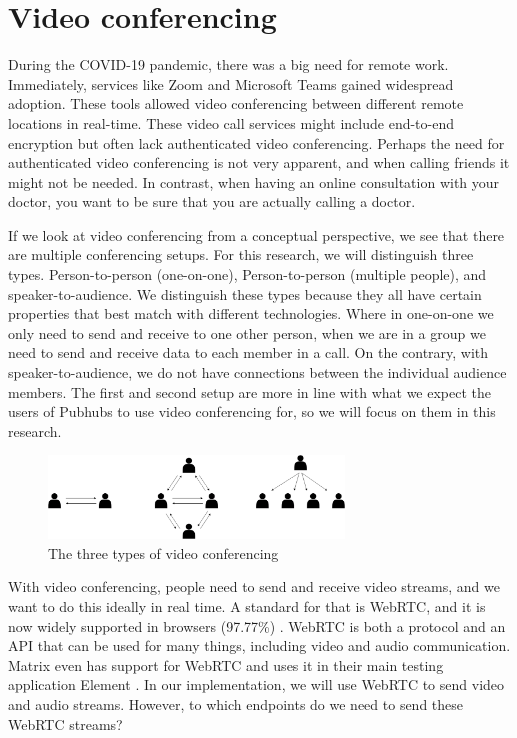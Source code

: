 \documentclass[11pt,a4paper]{article}
\begin{document}
\section{Video conferencing}
During the COVID-19 pandemic, there was a big need for remote work. Immediately, services like Zoom \cite{Zoom}  and Microsoft Teams  \cite{MSTeams} gained widespread adoption. These tools allowed video conferencing between different remote locations in real-time. These video call services might include end-to-end encryption but often lack authenticated video conferencing. Perhaps the need for authenticated video conferencing is not very apparent, and when calling friends it might not be needed. In contrast, when having an online consultation with your doctor, you want to be sure that you are actually calling a doctor.

If we look at video conferencing from a conceptual perspective, we see that there are multiple conferencing setups. For this research, we will distinguish three types. Person-to-person (one-on-one), Person-to-person (multiple people), and speaker-to-audience. We distinguish these types because they all have certain properties that best match with different technologies. Where in one-on-one we only need to send and receive to one other person, when we are in a group we need to send and receive data to each member in a call. On the contrary, with speaker-to-audience, we do not have connections between the individual audience members. The first and second setup are more in line with what we expect the users of Pubhubs to use video conferencing for, so we will focus on them in this research. 

\begin{figure}[!hbt]
    \centering
    \includegraphics[width=0.7\textwidth]{Research proposal/img/three types.drawio.png}
    \caption{The three types of video conferencing}
    \label{fig:enter-label}
\end{figure}

With video conferencing, people need to send and receive video streams, and we want to do this ideally in real time. A standard for that is WebRTC, and it is now widely supported in browsers (97.77\%) \cite{CIUIWEBRTC}. WebRTC is both a protocol and an API that can be used for many things, including video and audio communication. Matrix even has support for WebRTC and uses it in their main testing application Element \cite{ELEMENT}. In our implementation, we will use WebRTC to send video and audio streams. However, to which endpoints do we need to send these WebRTC streams?
\end{document}
